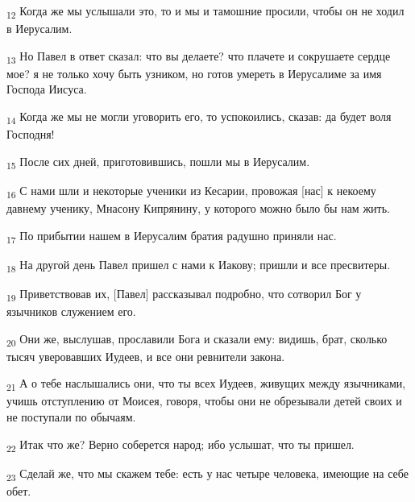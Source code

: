 \begin{tcolorbox}
\textsubscript{12} Когда же мы услышали это, то и мы и тамошние просили, чтобы он не ходил в Иерусалим.
\end{tcolorbox}
\begin{tcolorbox}
\textsubscript{13} Но Павел в ответ сказал: что вы делаете? что плачете и сокрушаете сердце мое? я не только хочу быть узником, но готов умереть в Иерусалиме за имя Господа Иисуса.
\end{tcolorbox}
\begin{tcolorbox}
\textsubscript{14} Когда же мы не могли уговорить его, то успокоились, сказав: да будет воля Господня!
\end{tcolorbox}
\begin{tcolorbox}
\textsubscript{15} После сих дней, приготовившись, пошли мы в Иерусалим.
\end{tcolorbox}
\begin{tcolorbox}
\textsubscript{16} С нами шли и некоторые ученики из Кесарии, провожая [нас] к некоему давнему ученику, Мнасону Кипрянину, у которого можно было бы нам жить.
\end{tcolorbox}
\begin{tcolorbox}
\textsubscript{17} По прибытии нашем в Иерусалим братия радушно приняли нас.
\end{tcolorbox}
\begin{tcolorbox}
\textsubscript{18} На другой день Павел пришел с нами к Иакову; пришли и все пресвитеры.
\end{tcolorbox}
\begin{tcolorbox}
\textsubscript{19} Приветствовав их, [Павел] рассказывал подробно, что сотворил Бог у язычников служением его.
\end{tcolorbox}
\begin{tcolorbox}
\textsubscript{20} Они же, выслушав, прославили Бога и сказали ему: видишь, брат, сколько тысяч уверовавших Иудеев, и все они ревнители закона.
\end{tcolorbox}
\begin{tcolorbox}
\textsubscript{21} А о тебе наслышались они, что ты всех Иудеев, живущих между язычниками, учишь отступлению от Моисея, говоря, чтобы они не обрезывали детей своих и не поступали по обычаям.
\end{tcolorbox}
\begin{tcolorbox}
\textsubscript{22} Итак что же? Верно соберется народ; ибо услышат, что ты пришел.
\end{tcolorbox}
\begin{tcolorbox}
\textsubscript{23} Сделай же, что мы скажем тебе: есть у нас четыре человека, имеющие на себе обет.
\end{tcolorbox}
